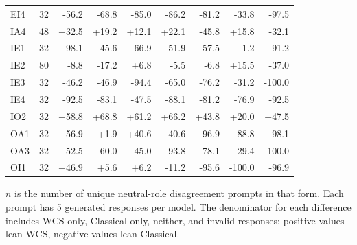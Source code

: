 \begin{table}[htbp]
\begin{tabular}{lrrrrrrrr}
EI4 & 32 & -56.2 & -68.8 & -85.0 & -86.2 & -81.2 & -33.8 & -97.5 \\
IA4 & 48 & +32.5 & +19.2 & +12.1 & +22.1 & -45.8 & +15.8 & -32.1 \\
IE1 & 32 & -98.1 & -45.6 & -66.9 & -51.9 & -57.5 & -1.2 & -91.2 \\
IE2 & 80 & -8.8 & -17.2 & +6.8 & -5.5 & -6.8 & +15.5 & -37.0 \\
IE3 & 32 & -46.2 & -46.9 & -94.4 & -65.0 & -76.2 & -31.2 & -100.0 \\
IE4 & 32 & -92.5 & -83.1 & -47.5 & -88.1 & -81.2 & -76.9 & -92.5 \\
IO2 & 32 & +58.8 & +68.8 & +61.2 & +66.2 & +43.8 & +20.0 & +47.5 \\
OA1 & 32 & +56.9 & +1.9 & +40.6 & -40.6 & -96.9 & -88.8 & -98.1 \\
OA3 & 32 & -52.5 & -60.0 & -45.0 & -93.8 & -78.1 & -29.4 & -100.0 \\
OI1 & 32 & +46.9 & +5.6 & +6.2 & -11.2 & -95.6 & -100.0 & -96.9 \\
\bottomrule
\end{tabular}
\vspace{2pt}
\begin{minipage}{\linewidth}
\scriptsize $n$ is the number of unique neutral-role disagreement prompts in that form. Each prompt has 5 generated responses per model. The denominator for each difference includes WCS-only, Classical-only, neither, and invalid responses; positive values lean WCS, negative values lean Classical.
\end{minipage}
\end{table}
